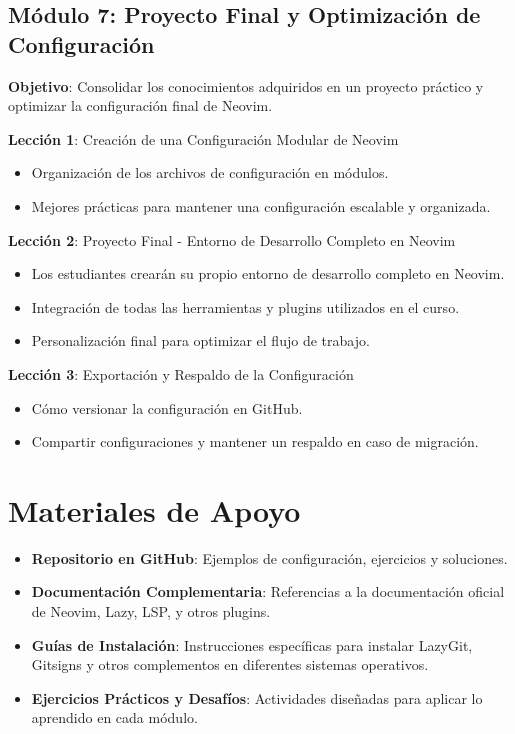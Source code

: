 \documentclass[
  a4paper,
  DIV=11,
  numbers=noendperiod,
  onepage,
  openany]{scrreprt}
\begin{document}
\subsection{\texorpdfstring{\textbf{Módulo 7}: Proyecto Final y
Optimización de
Configuración}{Módulo 7: Proyecto Final y Optimización de Configuración}}\label{muxf3dulo-7-proyecto-final-y-optimizaciuxf3n-de-configuraciuxf3n}

\textbf{Objetivo}: Consolidar los conocimientos adquiridos en un
proyecto práctico y optimizar la configuración final de Neovim.

\textbf{Lección 1}: Creación de una Configuración Modular de Neovim

\begin{itemize}
\item
  Organización de los archivos de configuración en módulos.
\item
  Mejores prácticas para mantener una configuración escalable y
  organizada.
\end{itemize}

\textbf{Lección 2}: Proyecto Final - Entorno de Desarrollo Completo en
Neovim

\begin{itemize}
\item
  Los estudiantes crearán su propio entorno de desarrollo completo en
  Neovim.
\item
  Integración de todas las herramientas y plugins utilizados en el
  curso.
\item
  Personalización final para optimizar el flujo de trabajo.
\end{itemize}

\textbf{Lección 3}: Exportación y Respaldo de la Configuración

\begin{itemize}
\item
  Cómo versionar la configuración en GitHub.
\item
  Compartir configuraciones y mantener un respaldo en caso de migración.
\end{itemize}

\section{Materiales de Apoyo}\label{materiales-de-apoyo}

\begin{itemize}
\item
  \textbf{Repositorio en GitHub}: Ejemplos de configuración, ejercicios
  y soluciones.
\item
  \textbf{Documentación Complementaria}: Referencias a la documentación
  oficial de Neovim, Lazy, LSP, y otros plugins.
\item
  \textbf{Guías de Instalación}: Instrucciones específicas para instalar
  LazyGit, Gitsigns y otros complementos en diferentes sistemas
  operativos.
\item
  \textbf{Ejercicios Prácticos y Desafíos}: Actividades diseñadas para
  aplicar lo aprendido en cada módulo.
\end{itemize}
\end{document}
